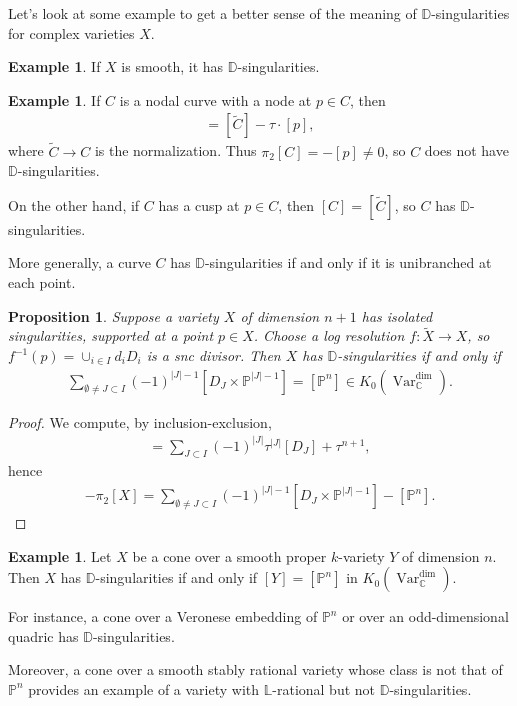 \documentclass{amsart}
\newtheorem{prop}[thm]{Proposition}
\theoremstyle{definition}
\newtheorem{exmp}[thm]{Example}
\DeclareMathOperator{\Var}{Var}
\numberwithin{equation}{section}
\begin{document}
Let's look at some example to get a better sense of the meaning of $\mathbb{D}$-singularities for complex varieties $X$.

\begin{exmp}
If $X$ is smooth, it has $\mathbb{D}$-singularities.
\end{exmp}

\begin{exmp}\label{curve example}
If $C$ is a nodal curve with a node at $p \in C$, then
\begin{align*}
    [C] = [\tilde{C}] - \tau \cdot [p],
\end{align*}
where $\tilde{C} \rightarrow C$ is the normalization. Thus $\pi_2[C] = - [p] \neq 0$, so $C$ does not have $\mathbb{D}$-singularities. 

On the other hand, if $C$ has a cusp at $p \in C$, then $[C] = [\tilde{C}]$, so $C$ has $\mathbb{D}$-singularities.

More generally, a curve $C$ has $\mathbb{D}$-singularities if and only if it is unibranched at each point.
\end{exmp}

\begin{prop}
Suppose a variety $X$ of dimension $n+1$ has isolated singularities, supported at a point $p \in X$. Choose a log resolution $f: \tilde{X} \rightarrow X$, so $f^{-1}(p) = \cup_{i \in I} d_i D_i$ is a snc divisor. Then $X$ has $\mathbb{D}$-singularities if and only if
\begin{align*}
    \sum_{\emptyset \neq J \subset I} (-1)^{|J|-1} [D_J \times \mathbb{P}^{|J|-1}] = [\mathbb{P}^n] \in K_0(\Var_{\mathbb{C}}^{\dim}).
\end{align*}
\end{prop}

\begin{proof}
We compute, by inclusion-exclusion,
\begin{align*}
    [X] = \sum_{J \subset I} (-1)^{|J|} \tau^{|J|} [D_J] + \tau^{n+1},
\end{align*}
hence
\begin{align*}
    -\pi_2[X] = \sum_{\emptyset \neq J \subset I} (-1)^{|J|-1} [D_J \times \mathbb{P}^{|J|-1}] - [\mathbb{P}^n].
\end{align*}
\end{proof}


\begin{exmp}
Let $X$ be a cone over a smooth proper $k$-variety $Y$ of dimension $n$. Then $X$ has $\mathbb{D}$-singularities if and only if $[Y] = [\mathbb{P}^{n}]$ in $K_0(\Var^{\dim}_\mathbb{C})$.

For instance, a cone over a Veronese embedding of $\mathbb{P}^n$ or over an odd-dimensional quadric has $\mathbb{D}$-singularities.

Moreover, a cone over a smooth stably rational variety whose class is not that of $\mathbb{P}^n$ provides an example of a variety with $\mathbb{L}$-rational but not $\mathbb{D}$-singularities.
\end{exmp}
\end{document}
